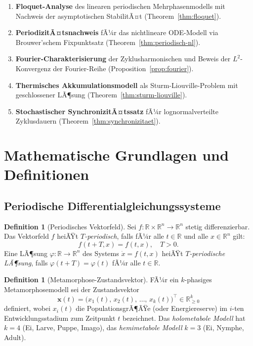 ﻿\documentclass[12pt, a4paper]{article}
\theoremstyle{definition}
\newtheorem{definition}[theorem]{Definition}
\newcommand{\R}{\mathbb{R}}
\begin{document}
\begin{enumerate}
  \item \textbf{Floquet-Analyse} des linearen periodischen Mehrphasenmodells mit
        Nachweis der asymptotischen StabilitÃ¤t (Theorem~\ref{thm:floquet}).
  \item \textbf{PeriodizitÃ¤tsnachweis} fÃ¼r das nichtlineare ODE-Modell via
        Brouwer'schem Fixpunktsatz (Theorem~\ref{thm:periodisch-nl}).
  \item \textbf{Fourier-Charakterisierung} der Zyklusharmonischen und Beweis der
        $L^2$-Konvergenz der Fourier-Reihe (Proposition~\ref{prop:fourier}).
  \item \textbf{Thermisches Akkumulationsmodell} als Sturm-Liouville-Problem mit
        geschlossener LÃ¶sung (Theorem~\ref{thm:sturm-liouville}).
  \item \textbf{Stochastischer SynchronizitÃ¤tssatz} fÃ¼r lognormalverteilte
        Zyklusdauern (Theorem~\ref{thm:synchronizitaet}).
\end{enumerate}

\section{Mathematische Grundlagen und Definitionen}

\subsection{Periodische Differentialgleichungssysteme}

\begin{definition}[Periodisches Vektorfeld]\label{def:periodisch}
Sei $f: \R \times \R^n \to \R^n$ stetig differenzierbar. Das Vektorfeld $f$
heiÃŸt \emph{$T$-periodisch}, falls fÃ¼r alle $t \in \R$ und alle $x \in \R^n$ gilt:
\[
  f(t + T, x) = f(t, x), \quad T > 0.
\]
Eine LÃ¶sung $\varphi: \R \to \R^n$ des Systems $\dot{x} = f(t, x)$ heiÃŸt
\emph{$T$-periodische LÃ¶sung}, falls $\varphi(t + T) = \varphi(t)$ fÃ¼r alle
$t \in \R$.
\end{definition}

\begin{definition}[Metamorphose-Zustandsvektor]\label{def:zustandsvektor}
FÃ¼r ein $k$-phasiges Metamorphosemodell sei der Zustandsvektor
\[
  \bm{x}(t) = \bigl(x_1(t),\, x_2(t),\, \ldots,\, x_k(t)\bigr)^\top \in \R_{\geq 0}^k
\]
definiert, wobei $x_i(t)$ die PopulationsgrÃ¶ÃŸe (oder Energiereserve) im $i$-ten
Entwicklungsstadium zum Zeitpunkt $t$ bezeichnet. Das \emph{holometabole Modell}
hat $k = 4$ (Ei, Larve, Puppe, Imago), das \emph{hemimetabole Modell} $k = 3$
(Ei, Nymphe, Adult).
\end{definition}
\end{document}
